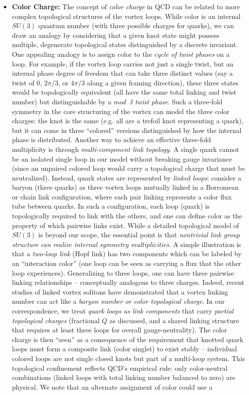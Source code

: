 \documentclass[12pt]{article}
\begin{document}
\begin{itemize}
    \item \textbf{Color Charge:} The concept of \emph{color charge} in QCD can be related to more complex topological structures of the vortex loops. While color is an internal $SU(3)$ quantum number (with three possible charges for quarks), we can draw an analogy by considering that a given knot state might possess multiple, degenerate topological states distinguished by a discrete invariant. One appealing analogy is to assign color to the \emph{cycle of twist phases} on a loop. For example, if the vortex loop carries not just a single twist, but an internal phase degree of freedom that can take three distinct values (say a twist of $0$, $2\pi/3$, or $4\pi/3$ along a given framing direction), these three states would be topologically equivalent (all have the same total linking and twist number) but distinguishable by a \emph{mod~3 twist phase}. Such a three-fold symmetry in the core structuring of the vortex can model the three color charges: the knot is the same (e.g. all are a trefoil knot representing a quark), but it can come in three “colored” versions distinguished by how the internal phase is distributed. Another way to achieve an effective three-fold multiplicity is through \emph{multi-component link topology}. A single quark cannot be an isolated single loop in our model without breaking gauge invariance (since an unpaired colored loop would carry a topological charge that must be neutralized). Instead, quark states are represented by \emph{linked loops}: consider a baryon (three quarks) as three vortex loops mutually linked in a Borromean or chain link configuration, where each pair linking represents a color flux tube between quarks. In such a configuration, each loop (quark) is topologically required to link with the others, and one can define color as the property of which pairwise links exist. While a detailed topological model of $SU(3)$ is beyond our scope, the essential point is that \emph{nontrivial link group structure can realize internal symmetry multiplicities}. A simple illustration is that a \emph{two-loop link} (Hopf link) has two components which can be labeled by an “interaction color” (one loop can be seen as carrying a flux that the other loop experiences). Generalizing to three loops, one can have three pairwise linking relationships – conceptually analogous to three charges. Indeed, recent studies of linked vortex solitons have demonstrated that a vortex linking number can act like a \emph{baryon number or color topological charge}\cite{arxiv2407.11731}. In our correspondence, we treat \emph{quark loops as link components} that carry \emph{partial topological charges} (fractional $Q$ as discussed, and a shared linking structure that requires at least three loops for overall gauge-neutrality). The color charge is then “seen” as a consequence of the requirement that knotted quark loops must form a composite link (color singlet) to exist stably – individual colored loops are not single closed knots but part of a multi-loop system. This topological confinement reflects QCD’s empirical rule: only color-neutral combinations (linked loops with total linking number balanced to zero) are physical. We note that an alternate assignment of color could use a 
\end{itemize}
\end{document}

